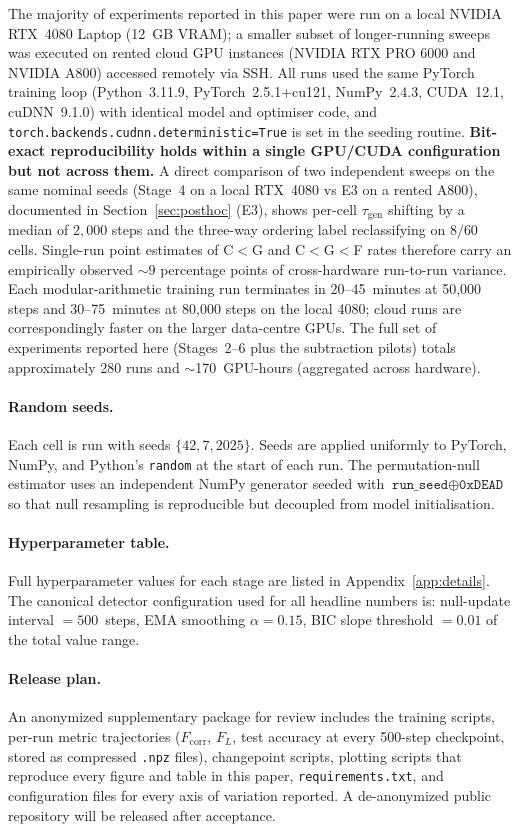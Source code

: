 \documentclass{article}
\newcommand{\taug}{\tau_{\mathrm{gen}}}
\newcommand{\fcorr}{F_{\mathrm{corr}}}
\newcommand{\flogit}{F_{L}}
\begin{document}
The majority of experiments reported in this paper were run on a
local NVIDIA RTX~4080 Laptop (12~GB VRAM); a smaller subset of
longer-running sweeps was executed on rented cloud GPU instances
(NVIDIA RTX PRO 6000 and NVIDIA A800) accessed remotely via SSH.
All runs used the same PyTorch training loop
(Python~3.11.9, PyTorch~2.5.1+cu121, NumPy~2.4.3,
CUDA~12.1, cuDNN~9.1.0)
with identical model and optimiser code,
and \texttt{torch.backends.cudnn.deterministic=True} is set in the
seeding routine.
\textbf{Bit-exact reproducibility holds within a single GPU/CUDA
configuration but not across them.}
A direct comparison of two independent sweeps on the same nominal
seeds (Stage~4 on a local RTX~4080 vs E3 on a rented A800),
documented in Section~\ref{sec:posthoc} (E3), shows per-cell
$\taug$ shifting by a median of $2{,}000$ steps and the three-way
ordering label reclassifying on $8/60$ cells.
Single-run point estimates of C$<$G and C$<$G$<$F rates therefore
carry an empirically observed $\sim$$9$ percentage points of
cross-hardware run-to-run variance.
Each modular-arithmetic training run terminates in
\mbox{20--45~minutes} at 50{,}000 steps and \mbox{30--75~minutes} at
80{,}000 steps on the local 4080; cloud runs are correspondingly
faster on the larger data-centre GPUs.
The full set of experiments reported here (Stages~2--6 plus the
subtraction pilots) totals approximately 280 runs and
\mbox{$\sim$170~GPU-hours} (aggregated across hardware).

\paragraph{Random seeds.}
Each cell is run with seeds $\{42, 7, 2025\}$.
Seeds are applied uniformly to PyTorch, NumPy, and Python's
\texttt{random} at the start of each run.
The permutation-null estimator uses an independent NumPy generator
seeded with $\texttt{run\_seed}\oplus\texttt{0xDEAD}$ so that null
resampling is reproducible but decoupled from model initialisation.

\paragraph{Hyperparameter table.}
Full hyperparameter values for each stage are listed in
Appendix~\ref{app:details}.
The canonical detector configuration used for all headline numbers
is: null-update interval $=500$~steps, EMA smoothing
$\alpha=0.15$, BIC slope threshold $=0.01$ of the total value range.

\paragraph{Release plan.}
An anonymized supplementary package for review includes the
training scripts, per-run metric trajectories ($\fcorr$, $\flogit$,
test accuracy at every 500-step checkpoint, stored as compressed
\texttt{.npz} files), changepoint scripts, plotting scripts that
reproduce every figure and table in this paper,
\texttt{requirements.txt}, and configuration files for every axis
of variation reported.
A de-anonymized public repository will be released after
acceptance.
\end{document}
